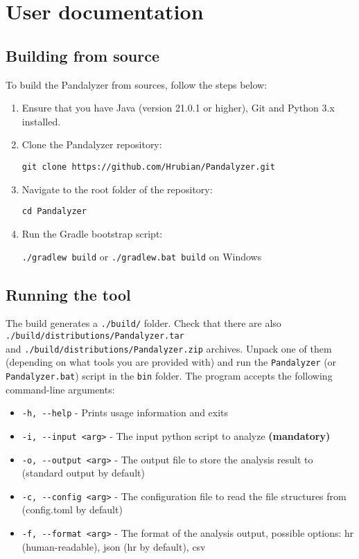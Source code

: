 \chapter{User documentation}\label{ch:user-documentation}


\section{Building from source}

To build the Pandalyzer from sources, follow the steps below:
\begin{enumerate}
    \item Ensure that you have Java (version 21.0.1 or higher), Git and Python 3.x installed.
    \item Clone the Pandalyzer repository:

    \verb|git clone https://github.com/Hrubian/Pandalyzer.git|
    \item Navigate to the root folder of the repository:

    \verb|cd Pandalyzer|
    \item Run the Gradle bootstrap script:

    \verb|./gradlew build| or \verb|./gradlew.bat build| on Windows
\end{enumerate}

\section{Running the tool}

The build generates a \verb|./build/| folder.
Check that there are also \\ \verb|./build/distributions/Pandalyzer.tar| \\ and
\verb|./build/distributions/Pandalyzer.zip| archives.
Unpack one of them (depending on what tools you are provided with) and run the \verb|Pandalyzer| (or
\verb|Pandalyzer.bat|) script in the \verb|bin| folder.
The program accepts the following command-line arguments:
\begin{itemize}
    \item \verb|-h, --help| - Prints usage information and exits
    \item \verb|-i, --input <arg>| - The input python script to analyze \textbf{(mandatory)}
    \item \verb|-o, --output <arg>| - The output file to store the analysis result to (standard output by default)
    \item \verb|-c, --config <arg>| - The configuration file to read the file structures from (config.toml by default)
    \item \verb|-f, --format <arg>| - The format of the analysis output, possible options: hr (human-readable), json (hr by default), csv
\end{itemize}
